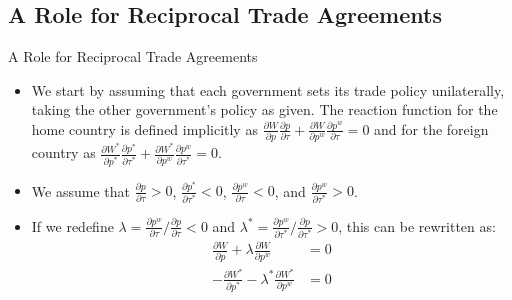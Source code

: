 \documentclass[aspectratio=169]{beamer}
\begin{document}

\subsection{A Role for Reciprocal Trade Agreements}


\begin{frame}{A Role for Reciprocal Trade Agreements}

\begin{itemize}
    \item<1-> We start by assuming that each government sets its trade policy unilaterally, taking the other government’s policy as given.  The reaction function for the home country is defined implicitly as $ \frac{\partial W}{\partial p} \frac{\partial p}{\partial \tau} + \frac{\partial W}{\partial p^{w}} \frac{\partial p^{w}}{\partial \tau} = 0 $ and for the foreign country as $ \frac{\partial W^{*}}{\partial p^{*}} \frac{\partial p^{*}}{\partial \tau^{*}} + \frac{\partial W^{*}}{\partial p^{w}} \frac{\partial p^{w}}{\partial \tau^{*}} = 0 $.
    \item<2-> We assume that $ \frac{\partial p}{\partial \tau} > 0 $, $ \frac{\partial p^{*}}{\partial \tau^{*}} < 0 $, $ \frac{\partial p^{w}}{\partial \tau} < 0 $, and $ \frac{\partial p^{w}}{\partial \tau^{*}} > 0 $.
    \item<3-> If we redefine $ \lambda = \frac{\partial p^{w}}{\partial \tau} / \frac{\partial p}{\partial \tau} < 0 $ and $ \lambda^{*} = \frac{\partial p^{w}}{\partial \tau^{*}} / \frac{\partial p}{\partial \tau^{*}} > 0 $, this can be rewritten as:
    \begin{align}
        \frac{\partial W}{\partial p} + \lambda \frac{\partial W}{\partial p^{w}} &= 0 \label{eq:homefoc} \\
        -\frac{\partial W^{*}}{\partial p^{*}} - \lambda^{*} \frac{\partial W^{*}}{\partial p^{w}} &= 0 \label{eq:foreignfoc}
    \end{align}
\end{itemize}
    
\end{frame}

\end{document}
